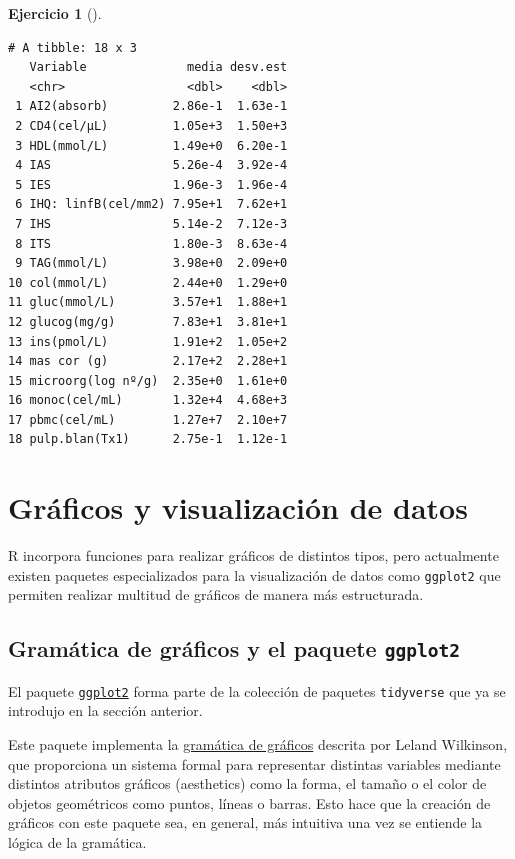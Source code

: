 \documentclass[
  spanish,
  a4paper,
]{scrreport}
\theoremstyle{definition}
\newtheorem{exercise}{Ejercicio}[chapter]
\theoremstyle{definition}
\theoremstyle{remark}
\begin{document}
\begin{exercise}[]
\begin{enumerate}
\begin{tcolorbox}
\begin{verbatim}
# A tibble: 18 x 3
   Variable              media desv.est
   <chr>                 <dbl>    <dbl>
 1 AI2(absorb)         2.86e-1  1.63e-1
 2 CD4(cel/µL)         1.05e+3  1.50e+3
 3 HDL(mmol/L)         1.49e+0  6.20e-1
 4 IAS                 5.26e-4  3.92e-4
 5 IES                 1.96e-3  1.96e-4
 6 IHQ: linfB(cel/mm2) 7.95e+1  7.62e+1
 7 IHS                 5.14e-2  7.12e-3
 8 ITS                 1.80e-3  8.63e-4
 9 TAG(mmol/L)         3.98e+0  2.09e+0
10 col(mmol/L)         2.44e+0  1.29e+0
11 gluc(mmol/L)        3.57e+1  1.88e+1
12 glucog(mg/g)        7.83e+1  3.81e+1
13 ins(pmol/L)         1.91e+2  1.05e+2
14 mas cor (g)         2.17e+2  2.28e+1
15 microorg(log nº/g)  2.35e+0  1.61e+0
16 monoc(cel/mL)       1.32e+4  4.68e+3
17 pbmc(cel/mL)        1.27e+7  2.10e+7
18 pulp.blan(Tx1)      2.75e-1  1.12e-1
\end{verbatim}

  \end{tcolorbox}
\end{enumerate}

\end{exercise}


\chapter{Gráficos y visualización de
datos}\label{gruxe1ficos-y-visualizaciuxf3n-de-datos}

R incorpora funciones para realizar gráficos de distintos tipos, pero
actualmente existen paquetes especializados para la visualización de
datos como \texttt{ggplot2} que permiten realizar multitud de gráficos
de manera más estructurada.

\section{\texorpdfstring{Gramática de gráficos y el paquete
\texttt{ggplot2}}{Gramática de gráficos y el paquete ggplot2}}\label{gramuxe1tica-de-gruxe1ficos-y-el-paquete-ggplot2}

El paquete \href{https://ggplot2.tidyverse.org/}{\texttt{ggplot2}} forma
parte de la colección de paquetes \texttt{tidyverse} que ya se introdujo
en la sección anterior.

Este paquete implementa la
\href{https://www.academia.edu/54823545/The_grammar_of_graphics}{gramática
de gráficos} descrita por Leland Wilkinson, que proporciona un sistema
formal para representar distintas variables mediante distintos atributos
gráficos (aesthetics) como la forma, el tamaño o el color de objetos
geométricos como puntos, líneas o barras. Esto hace que la creación de
gráficos con este paquete sea, en general, más intuitiva una vez se
entiende la lógica de la gramática.
\end{document}

